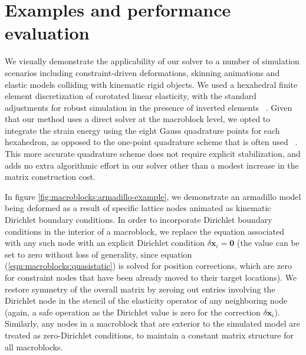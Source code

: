 
\section{Examples and performance evaluation}
\label{sec:macroblocks:examples}

We visually demonstrate the applicability of our solver to a number of
simulation scenarios including constraint-driven deformations,
skinning animations and elastic models colliding with kinematic rigid
objects.  We used a hexahedral finite element discretization of
corotated linear elasticity, with the standard adjustments for robust
simulation in the presence of inverted elements
~\citep{IrvinTF:2004}. Given that our method uses a direct solver at the
macroblock level, we opted to integrate the strain energy using the
eight Gauss quadrature points for each hexahedron, as opposed to the
one-point quadrature scheme that is often used
~\citep{McAdaZSETTS:2011,PatteMS:2012}. This more accurate quadrature
scheme does not require explicit stabilization, and adds no extra
algorithmic effort in our solver other than a modest increase in the
matrix construction cost.

In figure \ref{fig:macroblocks:armadillo-example}, we demonstrate an armadillo
model being deformed as a result of specific lattice nodes animated as
kinematic Dirichlet boundary conditions. In order to incorporate
Dirichlet boundary conditions in the interior of a macroblock, we
replace the equation associated with any such node with an explicit
Dirichlet condition $\delta\mathbf{x}_i=\mathbf{0}$ (the value can be
set to zero without loss of generality, since equation
(\ref{eqn:macroblocks:quasistatic}) is solved for position corrections, which are
zero for constraint nodes that have been already moved to their target
locations). We restore symmetry of the overall matrix by zeroing out
entries involving the Dirichlet node in the stencil of the elasticity
operator of any neighboring node (again, a safe operation as the
Dirichlet value is zero for the correction
$\delta\mathbf{x}_i$). Similarly, any nodes in a macroblock that are
exterior to the simulated model are treated as zero-Dirichlet
conditions, to maintain a constant matrix structure for all
macroblocks.

